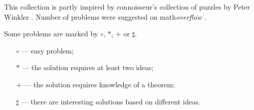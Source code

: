\documentclass[twoside]{book}
\begin{document}
This collection is partly inspired by connoisseur's collection of puzzles  by Peter Winkler \cite[see][]{winkler}.
Number of problems were suggested on math\textit{overflow} \cite[see][]{One-step}.

\vfill

Some problems are marked by $\circ$, $*$, $+$ or $\sharp$.
\begin{itemize}
\item[$\circ$] --- easy problem;%
\item[$*$] --- the solution requires at least two ideas;%
\item[$+$] --- the solution requires knowledge of a theorem;%
\item[$\sharp$] --- there are interesting solutions based on different ideas.%
\end{itemize}











%



\backmatter
\newpage
{}
{\small

}
\sloppy
\printbibliography[heading=bibintoc]
\fussy
\end{document}
